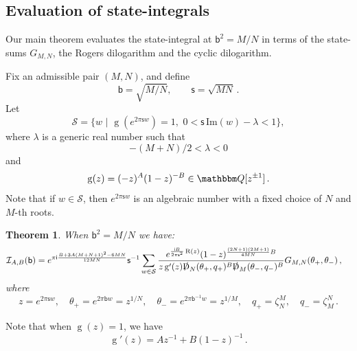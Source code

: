 \documentclass[12pt]{amsart}
\newtheorem{theorem}{Theorem}[section]
\theoremstyle{definition}
\def\BQ{\mathbbm Q}
\def\calI{\mathcal I}
\def\th{\theta}
\def\calS{\mathcal{S}}
\newcommand{\im}{\mathsf{i}}
\begin{document}
\subsection{Evaluation of state-integrals}
\label{sub.evaluation}

Our main theorem evaluates the state-integral at $\mathsf{b}^2=M/N$ 
in terms of the state-sums $G_{M,N}$, the Rogers dilogarithm and the
cyclic dilogarithm. 

Fix an admissible pair $(M,N)$, and define
\begin{equation}
\label{eq.bs}
\mathsf{b}= \sqrt{M/N}, \qquad \mathsf{s}= \sqrt{MN} \,.
\end{equation}
Let 
\begin{equation}
\label{eq.calS}
\calS =\{ w \,\, | \,\, %
\operatorname{g}(e^{2\pi\mathsf{s}w})=1, 
\,\, 0 < \mathsf{s}\, \mathrm{Im}(w)-\lambda < 1 \},
\end{equation}
where $\lambda$ is a generic real number such that 
\begin{equation}
\label{eq.lambda}
-(M+N)/2 < \lambda < 0
\end{equation}
and
\begin{equation}
\operatorname{g}(z)=%
(-z)^{A} (1-z)^{-B} \in \BQ[z^{\pm 1}] \,.
\end{equation}
Note that if $w \in\calS$, then $e^{2\pi\mathsf{s}w}$ 
is an algebraic number with a fixed choice of $N$ and $M$-th roots. 

\begin{theorem}
\label{thm.1}
When $\mathsf{b}^2=M/N$ we have:
\begin{align}
\label{eq.Ib}
\calI_{A,B}(\mathsf{b}) &=
e^{\pi\im \frac{B+3A(M+N+1)^2-6 M N}{12 M N}} %
\mathsf{s}^{-1}
\sum_{w \in \calS}
\frac{e^{\frac{\im B}{2\pi \mathsf{s}^2}\operatorname{R}(z)} 
(1-z)^{\frac{(2N+1)(2M+1)}{4 M N}B}
}{z \operatorname{g}'(z) \slashed{\operatorname{D}}_N(\th_+,q_+)^{B} 
\slashed{\operatorname{D}}_M(\th_-,q_-)^{B}}  
G_{M,N}(\th_+,\th_-) \,,
\end{align}
where
\begin{equation}
\label{eq.conventions}
z=e^{2\pi\mathsf{s}w}, \quad
\th_+ =e^{2\pi\mathsf{b}w}=z^{1/N}, \quad \th_- =
e^{2\pi\mathsf{b}^{-1}w}=z^{1/M}, \quad 
q_+ = \zeta_N^M, \quad q_-=\zeta_M^N \,.
\end{equation}
\end{theorem}
Note that when $\operatorname{g}(z)=1$, we have
\begin{equation}
\label{eq.gp}
\operatorname{g}'(z)=A z^{-1} + B (1-z)^{-1} \,.
\end{equation}
\end{document}
